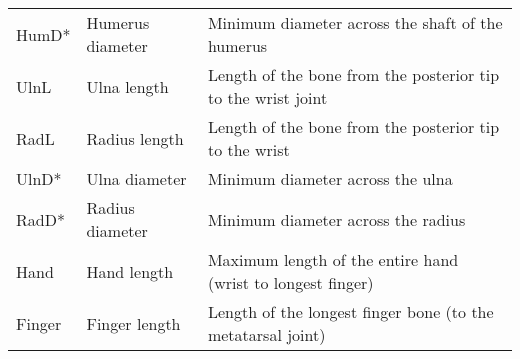 \begin{longtable}{p{2.4cm}p{3.2cm}p{9.5cm}}
HumD* & Humerus diameter & Minimum diameter across the shaft of the humerus \\
UlnL & Ulna length & Length of the bone from the posterior tip to the wrist joint \\
RadL & Radius length & Length of the bone from the posterior tip to the wrist \\
UlnD* & Ulna diameter & Minimum diameter across the ulna \\
RadD* & Radius diameter & Minimum diameter across the radius \\
Hand & Hand length & Maximum length of the entire hand (wrist to longest finger) \\
Finger & Finger length & Length of the longest finger bone (to the metatarsal joint) \\
\hline

\end{longtable}